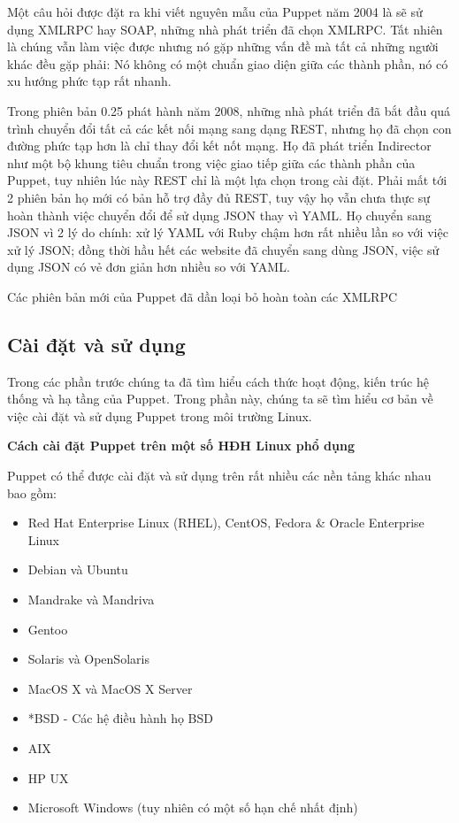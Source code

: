 Một câu hỏi được đặt ra khi viết nguyên mẫu của Puppet năm 2004 là sẽ sử dụng XMLRPC hay SOAP, những nhà phát triển đã chọn XMLRPC. Tất nhiên là chúng vẫn làm việc được nhưng nó gặp những vấn đề mà tất cả những người khác đều gặp phải: Nó không có một chuẩn giao diện giữa các thành phần, nó có xu hướng phức tạp rất nhanh.

Trong phiên bản 0.25 phát hành năm 2008, những nhà phát triển đã bắt đầu quá trình chuyển đổi tất cả các kết nối mạng sang dạng REST, nhưng họ đã chọn con đường phức tạp hơn là chỉ thay đổi kết nốt mạng. Họ đã phát triển Indirector như một bộ khung tiêu chuẩn trong việc giao tiếp giữa các thành phần của Puppet, tuy nhiên lúc này REST chỉ là một lựa chọn trong cài đặt. Phải mất tới 2 phiên bản họ mới có bản hỗ trợ đầy đủ REST, tuy vậy họ vẫn chưa thực sự hoàn thành việc chuyển đổi để sử dụng JSON thay vì YAML. Họ chuyển sang JSON vì 2 lý do chính: xử lý YAML với Ruby chậm hơn rất nhiều lần so với việc xử lý JSON; đồng thời hầu hết các website đã chuyển sang dùng JSON, việc sử dụng JSON có vẻ đơn giản hơn nhiều so với YAML.

Các phiên bản mới của Puppet đã dần loại bỏ hoàn toàn các XMLRPC

\subsection{Cài đặt và sử dụng}

Trong các phần trước chúng ta đã tìm hiểu cách thức hoạt động, kiến trúc hệ thống và hạ tầng của Puppet. Trong phần này, chúng ta sẽ tìm hiểu cơ bản về việc cài đặt và sử dụng Puppet trong môi trường Linux.

\textbf{\large Cách cài đặt Puppet trên một số HĐH Linux phổ dụng}

Puppet có thể được cài đặt và sử dụng trên rất nhiều các nền tảng khác nhau bao gồm:

\begin{itemize}
\item Red Hat Enterprise Linux (RHEL), CentOS, Fedora \& Oracle Enterprise Linux
\item Debian và Ubuntu
\item Mandrake và Mandriva
\item Gentoo
\item Solaris và OpenSolaris
\item MacOS X và MacOS X Server
\item *BSD - Các hệ điều hành họ BSD
\item AIX
\item HP UX
\item Microsoft Windows (tuy nhiên có một số hạn chế nhất định)
\end{itemize}

